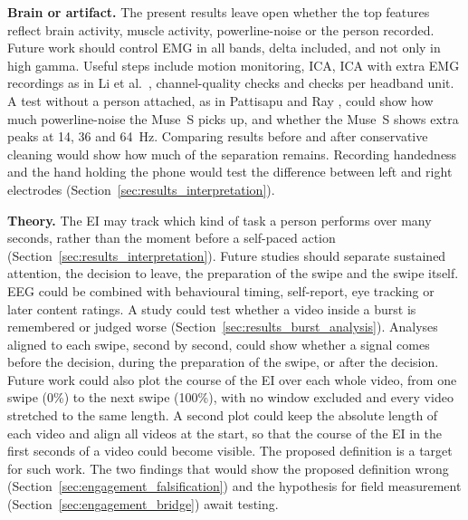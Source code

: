 \documentclass[12pt,a4paper]{report}
\begin{document}
\textbf{Brain or artifact.} The present results leave open whether the top features reflect brain activity, muscle activity, powerline-noise or the person recorded. Future work should control EMG in all bands, delta included, and not only in high gamma. Useful steps include motion monitoring, ICA, ICA with extra EMG recordings as in Li et al.\ \cite{li_electromyogram_2021}, channel-quality checks and checks per headband unit. A test without a person attached, as in Pattisapu and Ray \cite{pattisapu_stimulus-induced_2023}, could show how much powerline-noise the Muse~S picks up, and whether the Muse~S shows extra peaks at 14, 36 and 64~Hz. Comparing results before and after conservative cleaning would show how much of the separation remains. Recording handedness and the hand holding the phone would test the difference between left and right electrodes (Section~\ref{sec:results_interpretation}).

\textbf{Theory.} The EI may track which kind of task a person performs over many seconds, rather than the moment before a self-paced action (Section~\ref{sec:results_interpretation}). Future studies should separate sustained attention, the decision to leave, the preparation of the swipe and the swipe itself. EEG could be combined with behavioural timing, self-report, eye tracking or later content ratings. A study could test whether a video inside a burst is remembered or judged worse (Section~\ref{sec:results_burst_analysis}). Analyses aligned to each swipe, second by second, could show whether a signal comes before the decision, during the preparation of the swipe, or after the decision. Future work could also plot the course of the EI over each whole video, from one swipe (0\%) to the next swipe (100\%), with no window excluded and every video stretched to the same length. A second plot could keep the absolute length of each video and align all videos at the start, so that the course of the EI in the first seconds of a video could become visible. The proposed definition is a target for such work. The two findings that would show the proposed definition wrong (Section~\ref{sec:engagement_falsification}) and the hypothesis for field measurement (Section~\ref{sec:engagement_bridge}) await testing.
\end{document}
